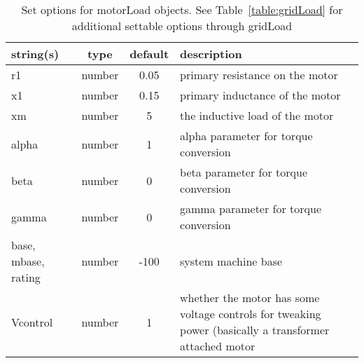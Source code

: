 \begin{table}[ht]
\centering
\begin{tabular}{p{5cm} c c p{7cm}}
\hline
string(s) & type & default & description \\
\hline
r1 & number & 0.05 & primary resistance on the motor\\
x1 & number & 0.15 & primary inductance of the motor\\
xm & number & 5 & the inductive load of the motor\\
alpha & number & 1 & alpha parameter for torque conversion\\
beta & number & 0 & beta parameter for torque conversion\\
gamma & number & 0 & gamma parameter for torque conversion\\
base, mbase, rating & number & -100 & system machine base\\
Vcontrol & number & 1 & whether the motor has some voltage controls for tweaking power (basically a transformer attached motor\\
\hline
\end{tabular}
\caption{Set options for motorLoad objects. See Table~\ref{table:gridLoad} for additional settable options through gridLoad}
\label{table:motorLoad}
\end{table}


